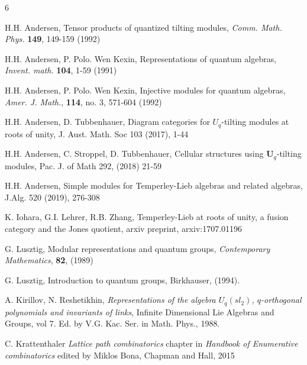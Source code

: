 \documentclass[11pt]{amsart}
\begin{document}
\begin{thebibliography}{6}  

 H.H. Andersen, Tensor products of quantized tilting modules,  {\it Comm. Math. Phys.} {\bf 149}, 149-159 
(1992) 

 H.H. Andersen, P. Polo. Wen Kexin, Representations of quantum algebras, {\it Invent. math.} {\bf 104}, 1-59 (1991) 

 H.H. Andersen, P. Polo. Wen Kexin, Injective modules for quantum algebras, {\it Amer. J. Math.}, {\bf 114}, no. 3, 571-604 (1992) 

 H.H. Andersen, D. Tubbenhauer, Diagram categories for $U_q$-tilting modules at roots of unity, J. Aust. Math. Soc 103 (2017), 1-44

 H.H. Andersen, C. Stroppel, D. Tubbenhauer, Cellular structures using $\mathbf{U}_q$-tilting modules, Pac. J. of Math 292, (2018) 21-59

 H.H. Andersen, Simple modules for Temperley-Lieb algebras and related algebras, J.Alg. 520 (2019), 276-308

 K. Iohara, G.I. Lehrer, R.B. Zhang, Temperley-Lieb at roots of unity, a fusion category and the Jones quotient, arxiv preprint, arxiv:1707.01196

 G. Lusztig, Modular representations and quantum groups, {\it Contemporary Mathematics}, {\bf 82}, (1989) 

 G. Lusztig, Introduction to quantum groups, Birkhauser, (1994). 


 A. Kirillov, N. Reshetikhin, {\it Representations of the algebra $U_q(sl_2)$, $q$-orthogonal polynomials and invariants of links}, Infinite Dimensional Lie Algebras and Groups, vol 7. Ed. by V.G. Kac. Ser. in Math. Phys., 1988.



 C. Krattenthaler
{\it Lattice path combinatorics} chapter in  {\it Handbook of Enumerative combinatorics} edited by Miklos Bona, Chapman and Hall, 2015


\end{thebibliography}
\end{document}
